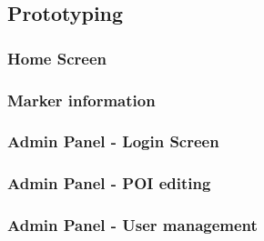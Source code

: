 \subsection{Prototyping}

\subsubsection{Home Screen}


\subsubsection{Marker information}

\subsubsection{Admin Panel - Login Screen}
\subsubsection{Admin Panel - POI editing}

\subsubsection{Admin Panel - User management}
